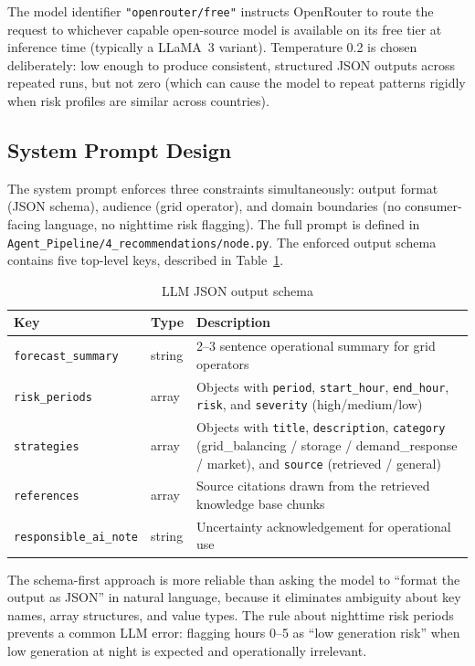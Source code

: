 \documentclass[12pt, a4paper]{article}
\begin{document}
The model identifier \texttt{"openrouter/free"} instructs OpenRouter to route the request to whichever capable open-source model is available on its free tier at inference time (typically a LLaMA~3 variant). Temperature 0.2 is chosen deliberately: low enough to produce consistent, structured JSON outputs across repeated runs, but not zero (which can cause the model to repeat patterns rigidly when risk profiles are similar across countries).

\clearpage
\subsection{System Prompt Design}

The system prompt enforces three constraints simultaneously: output format (JSON schema), audience (grid operator), and domain boundaries (no consumer-facing language, no nighttime risk flagging). The full prompt is defined in \texttt{Agent\_Pipeline/4\_recommendations/node.py}. The enforced output schema contains five top-level keys, described in Table~\ref{tab:llmschema}.

\begin{table}[H]
    \centering
    \caption{LLM JSON output schema}
    \label{tab:llmschema}
    \begin{tabularx}{\textwidth}{llX}
        \toprule
        \textbf{Key} & \textbf{Type} & \textbf{Description} \\
        \midrule
        \texttt{forecast\_summary} & string & 2--3 sentence operational summary for grid operators \\
        \texttt{risk\_periods} & array & Objects with \texttt{period}, \texttt{start\_hour}, \texttt{end\_hour}, \texttt{risk}, and \texttt{severity} (high/medium/low) \\
        \texttt{strategies} & array & Objects with \texttt{title}, \texttt{description}, \texttt{category} (grid\_balancing / storage / demand\_response / market), and \texttt{source} (retrieved / general) \\
        \texttt{references} & array & Source citations drawn from the retrieved knowledge base chunks \\
        \texttt{responsible\_ai\_note} & string & Uncertainty acknowledgement for operational use \\
        \bottomrule
    \end{tabularx}
\end{table}

The schema-first approach is more reliable than asking the model to ``format the output as JSON'' in natural language, because it eliminates ambiguity about key names, array structures, and value types. The rule about nighttime risk periods prevents a common LLM error: flagging hours 0--5 as ``low generation risk'' when low generation at night is expected and operationally irrelevant.
\end{document}
